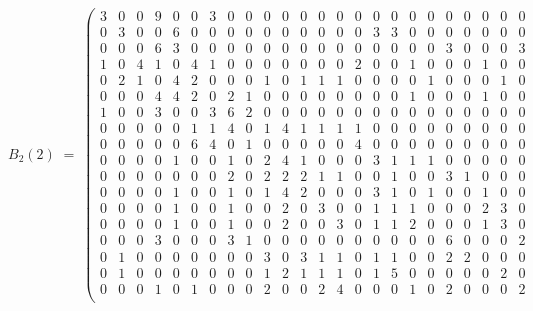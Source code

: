 \documentclass[11pt]{amsart}
\theoremstyle{plain}
\theoremstyle{definition}
\begin{document}
	\begingroup\scriptsize\setlength{\arraycolsep}{2.0pt}
	\[ B_2(2)\;=\;\left(\begin{array}{*{24}{r}}
		3 & 0 & 0 & 9 & 0 & 0 & 3 & 0 & 0 & 0 & 0 & 0 & 0 & 0 & 0 & 0 & 0 & 0 & 0 & 0 & 0 & 0 & 0 & 0 \\
		0 & 3 & 0 & 0 & 6 & 0 & 0 & 0 & 0 & 0 & 0 & 0 & 0 & 0 & 0 & 3 & 3 & 0 & 0 & 0 & 0 & 0 & 0 & 0 \\
		0 & 0 & 0 & 6 & 3 & 0 & 0 & 0 & 0 & 0 & 0 & 0 & 0 & 0 & 0 & 0 & 0 & 0 & 0 & 3 & 0 & 0 & 0 & 3 \\
		1 & 0 & 4 & 1 & 0 & 4 & 1 & 0 & 0 & 0 & 0 & 0 & 0 & 0 & 2 & 0 & 0 & 1 & 0 & 0 & 0 & 1 & 0 & 0 \\
		0 & 2 & 1 & 0 & 4 & 2 & 0 & 0 & 0 & 1 & 0 & 1 & 1 & 1 & 0 & 0 & 0 & 0 & 1 & 0 & 0 & 0 & 1 & 0 \\
		0 & 0 & 0 & 4 & 4 & 2 & 0 & 2 & 1 & 0 & 0 & 0 & 0 & 0 & 0 & 0 & 0 & 1 & 0 & 0 & 0 & 1 & 0 & 0 \\
		1 & 0 & 0 & 3 & 0 & 0 & 3 & 6 & 2 & 0 & 0 & 0 & 0 & 0 & 0 & 0 & 0 & 0 & 0 & 0 & 0 & 0 & 0 & 0 \\
		0 & 0 & 0 & 0 & 0 & 1 & 1 & 4 & 0 & 1 & 4 & 1 & 1 & 1 & 1 & 0 & 0 & 0 & 0 & 0 & 0 & 0 & 0 & 0 \\
		0 & 0 & 0 & 0 & 0 & 6 & 4 & 0 & 1 & 0 & 0 & 0 & 0 & 0 & 4 & 0 & 0 & 0 & 0 & 0 & 0 & 0 & 0 & 0 \\
		0 & 0 & 0 & 0 & 1 & 0 & 0 & 1 & 0 & 2 & 4 & 1 & 0 & 0 & 0 & 3 & 1 & 1 & 1 & 0 & 0 & 0 & 0 & 0 \\
		0 & 0 & 0 & 0 & 0 & 0 & 0 & 2 & 0 & 2 & 2 & 2 & 1 & 1 & 0 & 0 & 1 & 0 & 0 & 3 & 1 & 0 & 0 & 0 \\
		0 & 0 & 0 & 0 & 1 & 0 & 0 & 1 & 0 & 1 & 4 & 2 & 0 & 0 & 0 & 3 & 1 & 0 & 1 & 0 & 0 & 1 & 0 & 0 \\
		0 & 0 & 0 & 0 & 1 & 0 & 0 & 1 & 0 & 0 & 2 & 0 & 3 & 0 & 0 & 1 & 1 & 1 & 0 & 0 & 0 & 2 & 3 & 0 \\
		0 & 0 & 0 & 0 & 1 & 0 & 0 & 1 & 0 & 0 & 2 & 0 & 0 & 3 & 0 & 1 & 1 & 2 & 0 & 0 & 0 & 1 & 3 & 0 \\
		0 & 0 & 0 & 3 & 0 & 0 & 0 & 3 & 1 & 0 & 0 & 0 & 0 & 0 & 0 & 0 & 0 & 0 & 0 & 6 & 0 & 0 & 0 & 2 \\
		0 & 1 & 0 & 0 & 0 & 0 & 0 & 0 & 0 & 3 & 0 & 3 & 1 & 1 & 0 & 1 & 1 & 0 & 0 & 2 & 2 & 0 & 0 & 0 \\
		0 & 1 & 0 & 0 & 0 & 0 & 0 & 0 & 0 & 1 & 2 & 1 & 1 & 1 & 0 & 1 & 5 & 0 & 0 & 0 & 0 & 0 & 2 & 0 \\
		0 & 0 & 0 & 1 & 0 & 1 & 0 & 0 & 0 & 2 & 0 & 0 & 2 & 4 & 0 & 0 & 0 & 1 & 0 & 2 & 0 & 0 & 0 & 2 \\

\end{array}\]
\end{document}
